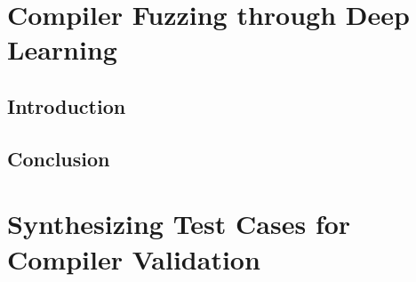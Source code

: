 \ifstapled
\chapter{Compiler Fuzzing through Deep Learning}
\section{Introduction}
\lipsum[1-2]

\section{Conclusion}
\lipsum[1-2]
\else
\chapter{Synthesizing Test Cases for Compiler Validation}






\fi
